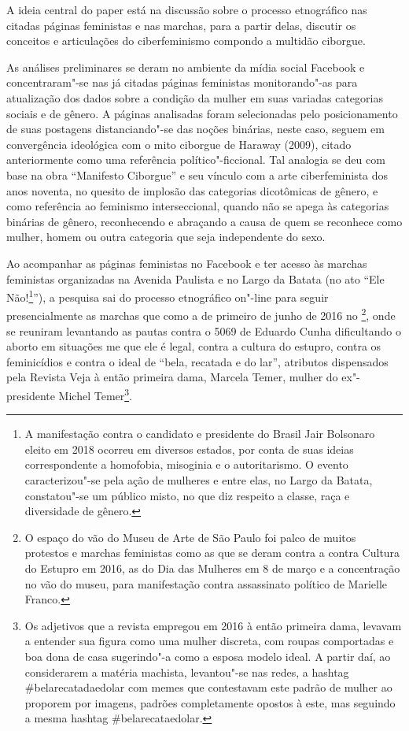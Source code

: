 A ideia central do paper está na discussão sobre o processo etnográfico
nas citadas páginas feministas e nas marchas, para a partir delas,
discutir os conceitos e articulações do ciberfeminismo compondo a
multidão ciborgue.

As análises preliminares se deram no ambiente da mídia social Facebook e
concentraram"-se nas já citadas páginas feministas monitorando"-as para
atualização dos dados sobre a condição da mulher em suas variadas
categorias sociais e de gênero. A páginas analisadas foram selecionadas
pelo posicionamento de suas postagens distanciando"-se das noções
binárias, neste caso, seguem em convergência ideológica com o mito
ciborgue de Haraway (2009), citado anteriormente como uma referência
político"-ficcional. Tal analogia se deu com base na obra ``Manifesto
Ciborgue'' e seu vínculo com a arte ciberfeminista dos anos noventa, no
quesito de implosão das categorias dicotômicas de gênero, e como
referência ao feminismo interseccional, quando não se apega às
categorias binárias de gênero, reconhecendo e abraçando a causa de quem
se reconhece como mulher, homem ou outra categoria que seja independente
do sexo.

Ao acompanhar as páginas feministas no Facebook e ter acesso às marchas
feministas organizadas na Avenida Paulista e no Largo da Batata (no ato
``Ele Não!\footnote{A manifestação contra o candidato e presidente do
  Brasil Jair Bolsonaro eleito em 2018 ocorreu em diversos estados, por
  conta de suas ideias correspondente a homofobia, misoginia e o
  autoritarismo. O evento caracterizou"-se pela ação de mulheres e entre
  elas, no Largo da Batata, constatou"-se um público misto, no que diz
  respeito a classe, raça e diversidade de gênero.}''), a pesquisa sai
do processo etnográfico on"-line para seguir presencialmente as marchas
que como a de primeiro de junho de 2016 no \footnote{O espaço do vão
  do Museu de Arte de São Paulo foi palco de muitos protestos e marchas
  feministas como as que se deram contra a contra Cultura do Estupro em
  2016, as do Dia das Mulheres em 8 de março e a concentração no vão do
  museu, para manifestação contra assassinato político de Marielle
  Franco.}, onde se reuniram levantando as pautas contra o  5069 de
Eduardo Cunha dificultando o aborto em situações me que ele é legal,
contra a cultura do estupro, contra os feminicídios e contra o ideal de
``bela, recatada e do lar'', atributos dispensados pela Revista Veja à
então primeira dama, Marcela Temer, mulher do ex"-presidente Michel
Temer\footnote{Os adjetivos que a revista empregou em 2016 à então
  primeira dama, levavam a entender sua figura como uma mulher discreta,
  com roupas comportadas e boa dona de casa sugerindo"-a como a esposa
  modelo ideal. A partir daí, ao considerarem a matéria machista,
  levantou"-se nas redes, a hashtag \#belarecatadaedolar com memes que
  contestavam este padrão de mulher ao proporem por imagens, padrões
  completamente opostos à este, mas seguindo a mesma hashtag
  \#belarecataedolar.}.

